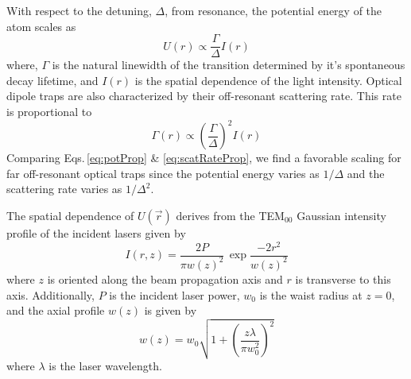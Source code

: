 With respect to the detuning, $\Delta$, from resonance, the potential energy of the atom scales as
\begin{equation} \label{eq:potProp}
	U(r) \varpropto \frac{\Gamma}{\Delta}I(r)
\end{equation}
where, $\Gamma$ is the natural linewidth of the transition determined by it's spontaneous decay lifetime, and $I(r)$ is the spatial dependence of the light intensity.
Optical dipole traps are also characterized by their off-resonant scattering rate.
This rate is proportional to
\begin{equation} \label{eq:scatRateProp}
	\Gamma(r) \varpropto \left(\frac{\Gamma}{\Delta}\right)^2 I(r)
\end{equation}
Comparing Eqs.\,\ref{eq:potProp} \& \ref{eq:scatRateProp}, we find a favorable scaling for far off-resonant optical traps since the potential energy varies as $1/\Delta$ and the scattering rate varies as $1/\Delta^2$. 

The spatial dependence of $U(\vec{r})$ derives from the TEM$_{00}$ Gaussian intensity profile of the incident lasers given by
\begin{equation} \label{eq:gaussInt}
	I(r,z) = \frac{2P}{\pi w(z)^2} \, \exp{\frac{-2 r^2}{w(z)^2}}
\end{equation}
where $z$ is oriented along the beam propagation axis and $r$ is transverse to this axis.
Additionally, $P$ is the incident laser power, $w_0$ is the waist radius at $z=0$, and the axial profile $w(z)$ is given by
\begin{equation} \label{eq:gaussSpot}
	w(z) = w_0 \sqrt{1 + \left( \frac{z \lambda}{\pi w_0^2} \right)^2}
\end{equation}
where $\lambda$ is the laser wavelength.

